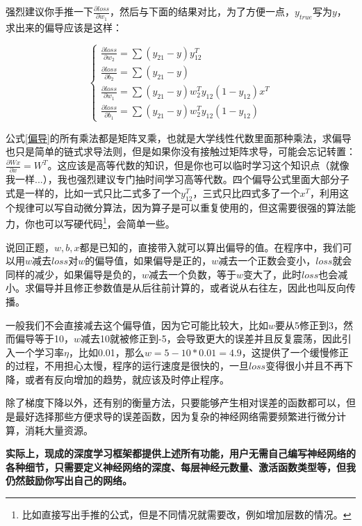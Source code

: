 \documentclass[a5paper, 11pt]{ctexbook}
\begin{document}
强烈建议你手推一下$\frac{\partial{loss}}{\partial{w_1}}$，然后与下面的结果对比，为了方便一点，$y_{true}$写为$y$，求出来的偏导应该是这样：

\begin{equation}\label{偏导}
    \begin{cases}
        \frac{\partial{loss}}{\partial{w_2}} = \sum(y_{21}-y)y_{12}^T                 \\
        \frac{\partial{loss}}{\partial{b_2}} = \sum(y_{21}-y)                         \\
        \frac{\partial{loss}}{\partial{w_1}} = \sum(y_{21}-y)w_2^Ty_{12}(1-y_{12})x^T \\
        \frac{\partial{loss}}{\partial{b_1}} = \sum(y_{21}-y)w_2^Ty_{12}(1-y_{12})
    \end{cases}
\end{equation}

公式\ref{偏导}的所有乘法都是矩阵叉乘，也就是大学线性代数里面那种乘法，求偏导也只是简单的链式求导法则，但是如果你没有接触过矩阵求导，可能会忘记转置：$\frac{\partial{Wx}}{\partial{x}}=W^T$。这应该是高等代数的知识，但是你也可以临时学习这个知识点（就像我一样...），我也强烈建议专门抽时间学习高等代数。四个偏导公式里面大部分子式是一样的，比如一式只比二式多了一个$y_{12}^T$，三式只比四式多了一个$x^T$，利用这个规律可以写自动微分算法，因为算子是可以重复使用的，但这需要很强的算法能力，你也可以写硬代码\footnote{\label{硬代码解释}比如直接写出手推的公式，但是不同情况就需要改，例如增加层数的情况。}，会简单一些。

说回正题，$w, b, x$都是已知的，直接带入就可以算出偏导的值。在程序中，我们可以用$w$减去$loss$对$w$的偏导值，如果偏导是正的，$w$减去一个正数会变小，$loss$就会同样的减少，如果偏导是负的，$w$减去一个负数，等于$w$变大了，此时$loss$也会减小。求偏导并且修正参数值是从后往前计算的，或者说从右往左，因此也叫反向传播。

一般我们不会直接减去这个偏导值，因为它可能比较大，比如$w$要从5修正到3，然而偏导等于10，$w$减去10就被修正到-5，会导致更大的误差并且反复震荡，因此引入一个学习率$\eta$，比如0.01，那么$w=5-10*0.01=4.9$，这提供了一个缓慢修正的过程，不用担心太慢，程序的运行速度是很快的，一旦$loss$变得很小并且不再下降，或者有反向增加的趋势，就应该及时停止程序。

除了梯度下降以外，还有别的衡量方法，只要能够产生相对误差的函数都可以，但是最好选择那些方便求导的误差函数，因为复杂的神经网络需要频繁进行微分计算，消耗大量资源。

\textbf{实际上，现成的深度学习框架都提供上述所有功能，用户无需自己编写神经网络的各种细节，只需要定义神经网络的深度、每层神经元数量、激活函数类型等，但我仍然鼓励你写出自己的网络。}
\end{document}
